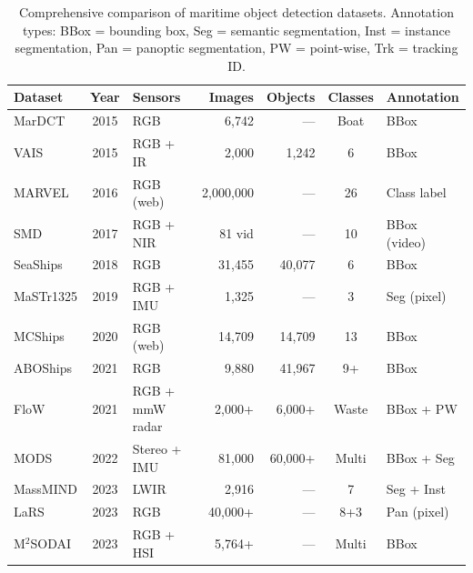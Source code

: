 \begin{table}[!htbp]
\centering
\caption{Comprehensive comparison of maritime object detection datasets. Annotation types:
BBox = bounding box, Seg = semantic segmentation, Inst = instance segmentation,
Pan = panoptic segmentation, PW = point-wise, Trk = tracking ID.}
\label{tab:maritime_datasets}
\small
\begin{tabularx}{\textwidth}{@{}l c l r r c X@{}}
\toprule
\textbf{Dataset} & \textbf{Year} & \textbf{Sensors} & \textbf{Images} & \textbf{Objects} & \textbf{Classes} & \textbf{Annotation} \\
\midrule
MarDCT \cite{Bloisi2015MarDCT}         & 2015 & RGB            &      6,742  &      ---   & Boat     & BBox \\
VAIS \cite{Zhang2015VAIS}              & 2015 & RGB + IR       &      2,000  &    1,242   & 6        & BBox \\
MARVEL \cite{Gundogdu2016MARVEL}       & 2016 & RGB (web)      &  2,000,000  &      ---   & 26       & Class label \\
SMD \cite{Prasad2017SMD}               & 2017 & RGB + NIR      &     81 vid  &      ---   & 10       & BBox (video) \\
SeaShips \cite{Shao2018SeaShips}       & 2018 & RGB            &     31,455  &   40,077   & 6        & BBox \\
MaSTr1325 \cite{Bovcon2019MaSTr1325}   & 2019 & RGB + IMU      &      1,325  &      ---   & 3        & Seg (pixel) \\
MCShips \cite{Zheng2020MCShips}        & 2020 & RGB (web)      &     14,709  &   14,709   & 13       & BBox \\
ABOShips \cite{Iancu2021ABOShips}      & 2021 & RGB            &      9,880  &   41,967   & 9+       & BBox \\
FloW \cite{Cheng2021FloW}              & 2021 & RGB + mmW radar &    2,000+  &    6,000+  & Waste    & BBox + PW \\
MODS \cite{Bovcon2022MODS}             & 2022 & Stereo + IMU   &     81,000  &   60,000+  & Multi    & BBox + Seg \\
MassMIND \cite{Nirgudkar2023MassMIND}  & 2023 & LWIR           &      2,916  &      ---   & 7        & Seg + Inst \\
LaRS \cite{Zust2023LaRS}               & 2023 & RGB            &     40,000+ &      ---   & 8+3      & Pan (pixel) \\
M$^2$SODAI \cite{Jang2023M2SODAI}      & 2023 & RGB + HSI      &      5,764+ &      ---   & Multi    & BBox \\

\end{tabularx}
\end{table}
